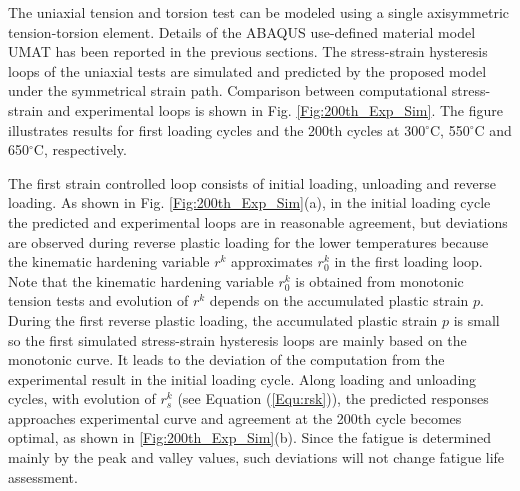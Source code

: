 \documentclass[preprint,5p,twocolumn,11pt,sort&compress]{elsarticle}
\begin{document}
\begin{figure*}
\caption{Comparison of the stress-strain hysteresis loops between experiments and computations  under isothermal uniaxial tensile loading conditions at 300$^{\circ}$C, 550$^{\circ}$C and 650$^{\circ}$C, respectively. (a) The first loading cycle. (b) The 200th cycle.}
\label{Fig:200th_Exp_Sim}
\end{figure*}

The uniaxial tension and torsion test can be modeled using a single axisymmetric tension-torsion element.
Details of the ABAQUS use-defined material model UMAT has been reported in the previous sections.
The stress-strain hysteresis loops of the uniaxial tests are simulated and predicted by the proposed model under the symmetrical strain path.
Comparison between  computational stress-strain and  experimental loops is shown in Fig. \ref{Fig:200th_Exp_Sim}.
The figure illustrates results for first loading cycles and the 200th cycles at 300$^{\circ}$C, 550$^{\circ}$C and 650$^{\circ}$C, respectively.

The first strain controlled loop consists of initial loading, unloading and reverse loading.
As shown in Fig. \ref{Fig:200th_Exp_Sim}(a), in the initial loading cycle the predicted and experimental loops are in reasonable agreement, but deviations are observed during reverse plastic loading for the lower temperatures because the kinematic hardening variable $r^k$ approximates ${r_0^k}$ in the first loading loop.
Note that the kinematic hardening variable ${r_0^k}$ is obtained from monotonic tension tests and evolution of $r^k$ depends on the accumulated plastic strain $p$.
During the first reverse plastic loading, the accumulated plastic strain $p$ is small so the first simulated stress-strain hysteresis loops are mainly based on the monotonic curve. It leads to the deviation of the computation from the experimental result in the initial loading cycle.
Along loading and unloading cycles, with evolution of $r_s^k$ (see Equation (\ref{Equ:rsk})), the predicted responses approaches experimental curve and agreement at the 200th cycle becomes optimal, as shown in \ref{Fig:200th_Exp_Sim}(b). Since the fatigue is determined mainly by the peak and valley values, such deviations will not change fatigue life assessment.
\end{document}

